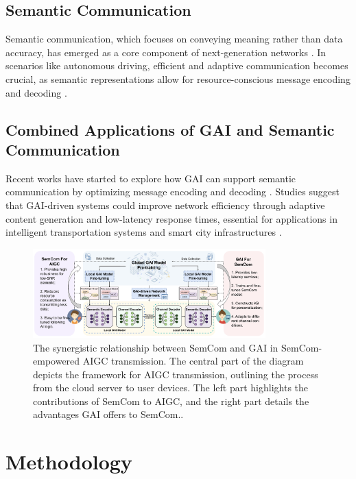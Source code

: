 \documentclass[journal]{IEEEtran}
\begin{document}
\subsection{Semantic Communication}
Semantic communication, which focuses on conveying meaning rather than data accuracy, has emerged as a core component of next-generation networks \cite{9955312}. In scenarios like autonomous driving, efficient and adaptive communication becomes crucial, as semantic representations allow for resource-conscious message encoding and decoding \cite{10319661,raha2023generativeaidrivensemanticcommunication}.

\subsection{Combined Applications of GAI and Semantic Communication}
Recent works have started to explore how GAI can support semantic communication by optimizing message encoding and decoding \cite{10447237}. Studies suggest that GAI-driven systems could improve network efficiency through adaptive content generation and low-latency response times, essential for applications in intelligent transportation systems and smart city infrastructures \cite{jiang2024largeaimodelbasedsemantic}.


\begin{figure}[htbp]
    \centering
    \includegraphics[width=0.8\textwidth]{2.png}
    \caption{The synergistic relationship between SemCom and GAI in SemCom-empowered AIGC transmission. The central part of the diagram depicts the framework for AIGC transmission, outlining the process from the cloud server to user devices. The left part highlights the contributions of SemCom to AIGC, and the right part details the advantages GAI offers to SemCom.\cite{10614204}.}
    \label{fig:synergistic_relationship}
\end{figure}

\section{Methodology}
\end{document}

